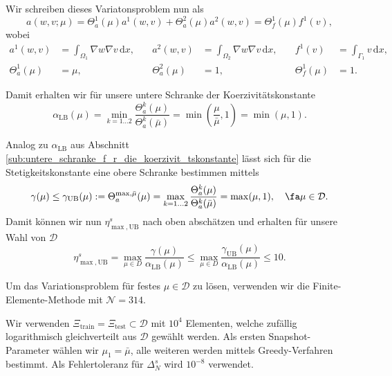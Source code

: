 Wir schreiben dieses Variatonsproblem nun als
\begin{equation}
    a(w, v;\mu) = \Theta_a^1(\mu) a^1(w, v) + \Theta_a^2(\mu) a^2(w, v) = \Theta_f^1(\mu) f^1(v),
\end{equation}
wobei
\begin{align}
    a^1(w, v) &= \int_{\Omega_1} \nabla w \nabla v \, \mathrm{d}x,
    \quad
    &a^2(w, v) &= \int_{\Omega_2} \nabla w \nabla v \, \mathrm{d}x,
    \quad
    &f^1(v) &= \int_{\Gamma_1} v \, \mathrm{d}x,
    \\
    \Theta_a^1(\mu) &= \mu,
    &\Theta_a^2(\mu) &= 1,
    &\Theta_f^1(\mu) &= 1.
\end{align}

Damit erhalten wir für unsere untere Schranke der Koerzivitätskonstante
\begin{equation}
    \alpha_\text{LB}(\mu) = \min_{k = 1 \ldots 2} \frac{\Theta_a^k(\mu)}{\Theta_a^k(\bar \mu)} = \min \left(  \frac{\mu}{\bar \mu}, 1  \right)  = \min(\mu, 1).
\end{equation}

Analog zu $\alpha_\text{LB}$ aus Abschnitt \ref{sub:untere_schranke_f_r_die_koerzivit_tskonstante} lässt sich für die Stetigkeitskonstante eine obere Schranke bestimmen mittels
\begin{equation}
    \gamma(\mu) \leq \gamma_\text{UB}(\mu) := \Theta_a^{\max, \bar \mu}(\mu) = \max_{k = 1 \ldots 2} \frac{\Theta_a^k(\mu)}{\Theta_a^k(\bar \mu)} = \max(\mu, 1), \quad \fa \mu \in \mathcal D.
\end{equation}
Damit können wir nun $\eta^s_{\max,\text{UB}}$ nach oben abschätzen und erhalten für unsere Wahl von $\mathcal D$
\begin{equation}
    \eta^s_{\max,\text{UB}} = \max_{\mu \in D} \frac{\gamma(\mu)}{\alpha_{\text{LB}}(\mu)} \leq \max_{\mu \in D} \frac{\gamma_\text{UB}(\mu)}{\alpha_{\text{LB}}(\mu)} \leq 10.
\end{equation}

Um das Variationsproblem für festes $\mu \in \mathcal D$ zu lösen, verwenden wir die Finite-Elemente-Methode mit $\mathcal N = 314$.

Wir verwenden $\Xi_\text{train} = \Xi_\text{test} \subset \mathcal D$ mit $10^4$ Elementen, welche zufällig logarithmisch gleichverteilt aus $\mathcal D$ gewählt werden.
Als ersten Snapshot-Parameter wählen wir $\mu_1 = \bar \mu$, alle weiteren werden mittels Greedy-Verfahren bestimmt. Als Fehlertoleranz für $\Delta^s_N$ wird $10^{-8}$ verwendet.

